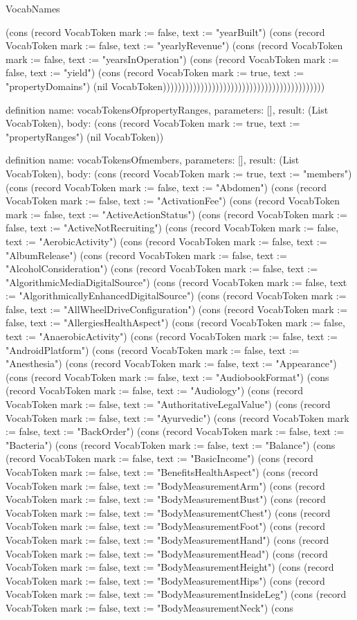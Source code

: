 \begin{lexlean}{VocabNames}
\begin{semanticmodule}
{(cons (record VocabToken {mark := false, text := "yearBuilt"}) (cons (record VocabToken {mark := false, text := "yearlyRevenue"}) (cons (record VocabToken {mark := false, text := "yearsInOperation"}) (cons (record VocabToken {mark := false, text := "yield"}) (cons (record VocabToken {mark := true, text := "propertyDomains"}) (nil VocabToken)))))))))))))))))))))))))))))))))))))))))))
}

definition{
  name: vocabTokensOfpropertyRanges,
  parameters: [],
  result: (List VocabToken),
  body: (cons (record VocabToken {mark := true, text := "propertyRanges"}) (nil VocabToken))
}

definition{
  name: vocabTokensOfmembers,
  parameters: [],
  result: (List VocabToken),
  body: (cons (record VocabToken {mark := true, text := "members"}) (cons (record VocabToken {mark := false, text := "Abdomen"}) (cons (record VocabToken {mark := false, text := "ActivationFee"}) (cons (record VocabToken {mark := false, text := "ActiveActionStatus"}) (cons (record VocabToken {mark := false, text := "ActiveNotRecruiting"}) (cons (record VocabToken {mark := false, text := "AerobicActivity"}) (cons (record VocabToken {mark := false, text := "AlbumRelease"}) (cons (record VocabToken {mark := false, text := "AlcoholConsideration"}) (cons (record VocabToken {mark := false, text := "AlgorithmicMediaDigitalSource"}) (cons (record VocabToken {mark := false, text := "AlgorithmicallyEnhancedDigitalSource"}) (cons (record VocabToken {mark := false, text := "AllWheelDriveConfiguration"}) (cons (record VocabToken {mark := false, text := "AllergiesHealthAspect"}) (cons (record VocabToken {mark := false, text := "AnaerobicActivity"}) (cons (record VocabToken {mark := false, text := "AndroidPlatform"}) (cons (record VocabToken {mark := false, text := "Anesthesia"}) (cons (record VocabToken {mark := false, text := "Appearance"}) (cons (record VocabToken {mark := false, text := "AudiobookFormat"}) (cons (record VocabToken {mark := false, text := "Audiology"}) (cons (record VocabToken {mark := false, text := "AuthoritativeLegalValue"}) (cons (record VocabToken {mark := false, text := "Ayurvedic"}) (cons (record VocabToken {mark := false, text := "BackOrder"}) (cons (record VocabToken {mark := false, text := "Bacteria"}) (cons (record VocabToken {mark := false, text := "Balance"}) (cons (record VocabToken {mark := false, text := "BasicIncome"}) (cons (record VocabToken {mark := false, text := "BenefitsHealthAspect"}) (cons (record VocabToken {mark := false, text := "BodyMeasurementArm"}) (cons (record VocabToken {mark := false, text := "BodyMeasurementBust"}) (cons (record VocabToken {mark := false, text := "BodyMeasurementChest"}) (cons (record VocabToken {mark := false, text := "BodyMeasurementFoot"}) (cons (record VocabToken {mark := false, text := "BodyMeasurementHand"}) (cons (record VocabToken {mark := false, text := "BodyMeasurementHead"}) (cons (record VocabToken {mark := false, text := "BodyMeasurementHeight"}) (cons (record VocabToken {mark := false, text := "BodyMeasurementHips"}) (cons (record VocabToken {mark := false, text := "BodyMeasurementInsideLeg"}) (cons (record VocabToken {mark := false, text := "BodyMeasurementNeck"}) (cons }
\end{semanticmodule}
\end{lexlean}
